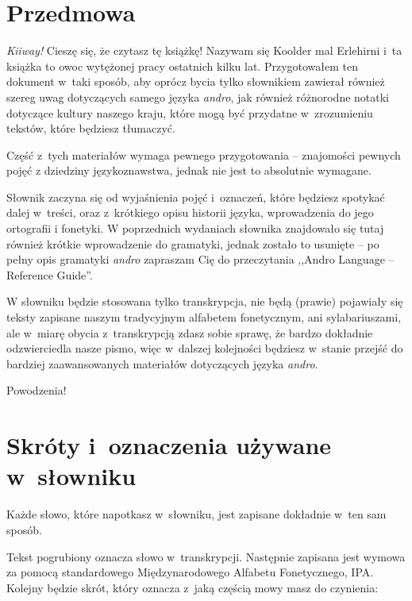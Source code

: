 \newpage

\section{Przedmowa}

\begin{spacing}{1.1}

    \emph{Kiiway!} Cieszę się, że czytasz tę książkę! Nazywam się Koolder mal
    Erlehirni i~ta książka to owoc wytężonej pracy ostatnich kilku lat.
    Przygotowałem ten dokument w~taki sposób, aby oprócz bycia tylko słownikiem
    zawierał również szereg uwag dotyczących samego języka \emph{andro}, jak
    również różnorodne notatki dotyczące kultury naszego kraju, które mogą być
    przydatne w~zrozumieniu tekstów, które będziesz tłumaczyć.

    Część z~tych materiałów wymaga pewnego przygotowania -- znajomości pewnych pojęć
    z dziedziny językoznawstwa, jednak nie jest to absolutnie wymagane.

    Słownik zaczyna się od wyjaśnienia pojęć i~oznaczeń, które będziesz spotykać
    dalej w~treści, oraz z~krótkiego opisu historii języka, wprowadzenia do jego
    ortografii i fonetyki. W poprzednich wydaniach słownika znajdowało się tutaj
    również krótkie wprowadzenie do gramatyki, jednak zostało to usunięte -- po
    pełny opis gramatyki \emph{andro} zapraszam Cię do przeczytania ,,Andro Language
    -- Reference Guide''.

    W słowniku będzie stosowana tylko transkrypcja, nie będą (prawie) pojawiały się
    teksty zapisane naszym tradycyjnym alfabetem fonetycznym, ani sylabariuszami,
    ale w~miarę obycia z~transkrypcją zdasz sobie sprawę, że bardzo dokładnie
    odzwierciedla nasze pismo, więc w~dalszej kolejności będziesz w~stanie przejść
    do bardziej zaawansowanych materiałów dotyczących języka \emph{andro}.

    \bigskip

    Powodzenia!

    \section[Skróty i~oznaczenia]{Skróty i~oznaczenia używane w~słowniku}

    Każde słowo, które napotkasz w~słowniku, jest zapisane dokładnie w~ten sam
    sposób.

    Tekst pogrubiony oznacza słowo w~transkrypcji. Następnie zapisana jest wymowa za
    pomocą standardowego Międzynarodowego Alfabetu Fonetycznego, IPA. Kolejny będzie
    skrót, który oznacza z~jaką częścią mowy masz do czynienia:


\end{spacing}
